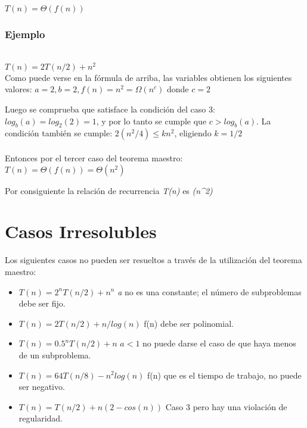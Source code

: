 \documentclass[12pt]{article}
\begin{document}
$T(n)= \Theta(f(n))$

\subsubsection{Ejemplo}\\

$T(n)=2T(n/2)+n^2$\\

Como puede verse en la fórmula de arriba, las variables obtienen los siguientes valores: $a=2 , b=2, f(n)=n^2 = \Omega(n^c)$ donde $c=2$

Luego se comprueba que satisface la condición del caso 3: $log_{b}(a)=log_{2}(2)= 1$, y por lo tanto se cumple que $c>log_{b}(a)$.
La condición también se cumple: $2(n^2/4)\leq kn^2$, eligiendo $k=1/2$\\\\
Entonces por el tercer caso del teorema maestro: 
$T(n)= \Theta(f(n))=\Theta(n^2)$

Por consiguiente la relación de recurrencia \textit{T(n)} es \textit{\Omega(n^2)}
\section{Casos Irresolubles}
Los siguientes casos no pueden ser resueltos a través de la utilización del teorema maestro:

\begin{itemize}
    \item $T(n)= 2^nT(n/2)+n^n$ \textit{a} no es una constante; el número de subproblemas debe ser fijo.
    \item $T(n)= 2T(n/2)+n/log(n)$ f(n) debe ser polinomial.
    \item $T(n)= 0.5^nT(n/2)+n$ $a<1$ no puede darse el caso de que haya menos de un subproblema.
    \item $T(n)= 64T(n/8)-n^2log(n)$ f(n) que es el tiempo de trabajo, no puede ser negativo.
    \item $T(n)= T(n/2)+n(2-cos(n))$ Caso 3 pero hay una violación de regularidad.
\end{itemize}\cite{wiki:pedia}

\printbibliography
\end{document}
